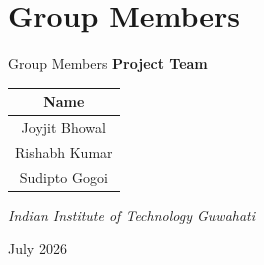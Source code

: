 \documentclass[aspectratio=169, 12pt]{beamer}
\begin{document}
\section*{Group Members}

\begin{frame}{Group Members}
  \centering
  \bigskip
  \textbf{Project Team}

  \bigskip
  \begin{tabular}{c}
    \toprule
    Name \\
    \midrule
    Joyjit Bhowal \\
    Rishabh Kumar \\
    Sudipto Gogoi \\
    \bottomrule
  \end{tabular}

  \bigskip\bigskip
  \emph{Indian Institute of Technology Guwahati}

  \medskip
  July 2026
\end{frame}
\end{document}
